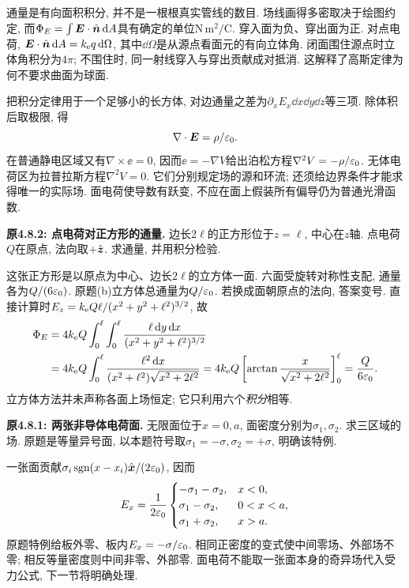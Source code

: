 \label{tb:gauss-local}
通量是有向面积积分, 并不是一根根真实管线的数目. 场线画得多密取决于绘图约定, 而$\Phi_E=\int\boldsymbol{E}\cdot\hat{\boldsymbol{n}}\,\mathrm d A$具有确定的单位$\mathrm{N\,m^2/C}$. 穿入面为负、穿出面为正. 对点电荷, $\boldsymbol{E}\cdot\hat{\boldsymbol{n}}\,\mathrm d A=k_{\mathrm e} q\,\mathrm d\Omega$, 其中$\dd\Omega$是从源点看面元的有向立体角. 闭面围住源点时立体角积分为$4\pi$; 不围住时, 同一射线穿入与穿出贡献成对抵消. 这解释了高斯定律为何不要求曲面为球面.

把积分定律用于一个足够小的长方体, 对边通量之差为$\partial_xE_x\dd x\dd y\dd z$等三项. 除体积后取极限, 得
\[\nabla\cdot\boldsymbol{E}=\rho/\varepsilon_0.\]
在普通静电区域又有$\nabla\times\ee=0$, 因而$\ee=-\nabla V$给出泊松方程$\nabla^2V=-\rho/\varepsilon_0$. 无体电荷区为拉普拉斯方程$\nabla^2V=0$. 它们分别规定场的源和环流; 还须给边界条件才能求得唯一的实际场. 面电荷使导数有跃变, 不应在面上假装所有偏导仍为普通光滑函数.

\begin{example}
\textbf{原4.8.2: 点电荷对正方形的通量.} \label{ex:squareflux}
边长$2\ell$的正方形位于$z=\ell$, 中心在$z$轴. 点电荷$Q$在原点, 法向取$+\hat{\boldsymbol{z}}$. 求通量, 并用积分检验.
\end{example}
\begin{solution}
这张正方形是以原点为中心、边长$2\ell$的立方体一面. 六面受旋转对称性支配, 通量各为$Q/(6\varepsilon_0)$. 原题(b)立方体总通量为$Q/\varepsilon_0$. 若换成面朝原点的法向, 答案变号. 直接计算时$E_z=k_{\mathrm e} Q\ell/(x^2+y^2+\ell^2)^{3/2}$, 故
\begin{align*}
\Phi_E&=4k_{\mathrm e} Q\int_0^\ell\int_0^\ell
\frac{\ell\,\mathrm d y\,\mathrm d x}{(x^2+y^2+\ell^2)^{3/2}}\\
&=4k_{\mathrm e} Q\int_0^\ell\frac{\ell^2\,\mathrm d x}{(x^2+\ell^2)\sqrt{x^2+2\ell^2}}
=4k_{\mathrm e} Q\left[\arctan\frac{x}{\sqrt{x^2+2\ell^2}}\right]_0^\ell
=\frac Q{6\varepsilon_0}.
\end{align*}
立方体方法并未声称各面上场恒定; 它只利用六个\emph{积分}相等.
\end{solution}

\begin{example}
\textbf{原4.8.1: 两张非导体电荷面.} 
无限面位于$x=0,a$, 面密度分别为$\sigma_1,\sigma_2$. 求三区域的场. 原题是等量异号面, 以本题符号取$\sigma_1=-\sigma,\sigma_2=+\sigma$, 明确该特例.
\end{example}
\begin{solution}
一张面贡献$\sigma_i\operatorname{sgn}(x-x_i)\hat{\boldsymbol{x}}/(2\varepsilon_0)$, 因而
\[E_x=\frac1{2\varepsilon_0}\begin{cases}-\sigma_1-\sigma_2,&x<0,\\ \sigma_1-\sigma_2,&0<x<a,\\ \sigma_1+\sigma_2,&x>a.\end{cases}\]
原题特例给板外零、板内$E_x=-\sigma/\varepsilon_0$. 相同正密度的变式使中间零场、外部场不零; 相反等量密度则中间非零、外部零. 面电荷不能取一张面本身的奇异场代入受力公式, 下一节将明确处理.
\end{solution}

